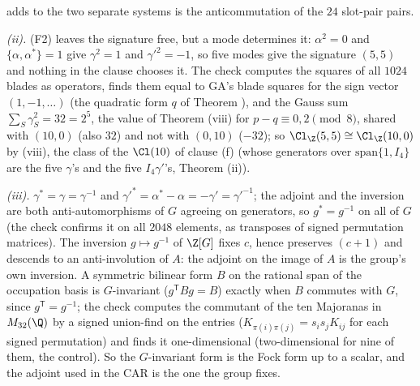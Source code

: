 adds to the two separate systems is the anticommutation of the $24$ slot-pair pairs.

\emph{(ii).} (F2) leaves the signature free, but a mode determines it: $\alpha^{2} = 0$ and $\{\alpha, \alpha^{*}\} = 1$ give $\gamma^{2} = 1$ and $\gamma'^{2} = -1$, so five modes give the signature $(5,5)$ and nothing in the clause chooses it. The check computes the squares of all $1024$ blades as operators, finds them equal to GA's blade squares for the sign vector $(1, -1, \dots)$ (the quadratic form $q$ of Theorem ), and the Gauss sum $\sum_{S}\gamma_{S}^{2} = 32 = 2^{5}$, the value of Theorem (viii) for $p - q \equiv 0, 2 \pmod 8$, shared with $(10,0)$ (also $32$) and not with $(0,10)$ ($-32$); so $\Cl_{\Z}(5,5) \cong \Cl_{\Z}(10,0)$ by (viii), the class of the $\Cl(10)$ of clause (f) (whose generators over $\mathrm{span}\{1, I_{4}\}$ are the five $\gamma$'s and the five $I_{4}\gamma'$'s, Theorem (ii)).

\emph{(iii).} $\gamma^{*} = \gamma = \gamma^{-1}$ and $\gamma'^{*} = \alpha^{*} - \alpha = -\gamma' = \gamma'^{-1}$; the adjoint and the inversion are both anti-automorphisms of $G$ agreeing on generators, so $g^{*} = g^{-1}$ on all of $G$ (the check confirms it on all $2048$ elements, as transposes of signed permutation matrices). The inversion $g \mapsto g^{-1}$ of $\Z[G]$ fixes $c$, hence preserves $(c + 1)$ and descends to an anti-involution of $A$: the adjoint on the image of $A$ is the group's own inversion. A symmetric bilinear form $B$ on the rational span of the occupation basis is $G$-invariant ($g^{\mathsf T}Bg = B$) exactly when $B$ commutes with $G$, since $g^{\mathsf T} = g^{-1}$; the check computes the commutant of the ten Majoranas in $M_{32}(\Q)$ by a signed union-find on the entries ($K_{\pi(i)\pi(j)} = s_{i}s_{j}K_{ij}$ for each signed permutation) and finds it one-dimensional (two-dimensional for nine of them, the control). So the $G$-invariant form is the Fock form up to a scalar, and the adjoint used in the CAR is the one the group fixes.

